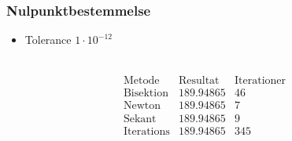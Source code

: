 \begin{frame}
\frametitle{Nulpunktbestemmelse}
\begin{itemize}
\item Tolerance $1\cdot10^{-12}$
\end{itemize}
\phantom{H} \\
\centering
$$\begin{array}{l|c|c}
\text{Metode} & \text{Resultat} & \text{Iterationer}\\
\hline
\text{Bisektion}	& 189.94865 & 46\\
\text{Newton}		& 189.94865 & 7\\
\text{Sekant}		& 189.94865 & 9\\
\text{Iterations}	& 189.94865 & 345
\end{array}$$
\end{frame}